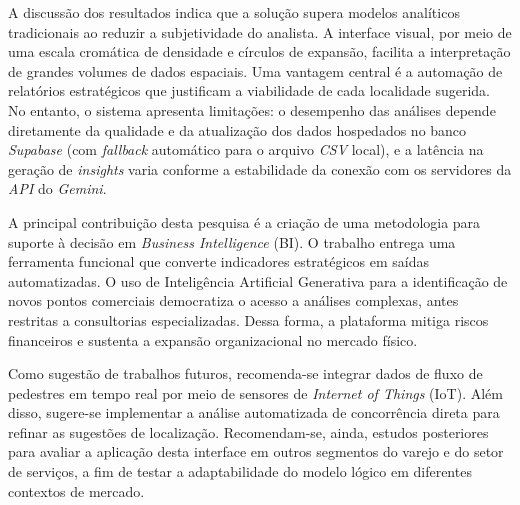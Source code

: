 A discussão dos resultados indica que a solução supera modelos analíticos tradicionais ao reduzir a subjetividade do analista. A interface visual, por meio de uma escala cromática de densidade e círculos de expansão, facilita a interpretação de grandes volumes de dados espaciais. Uma vantagem central é a automação de relatórios estratégicos que justificam a viabilidade de cada localidade sugerida. No entanto, o sistema apresenta limitações: o desempenho das análises depende diretamente da qualidade e da atualização dos dados hospedados no banco \textit{Supabase} (com \textit{fallback} automático para o arquivo \textit{CSV} local), e a latência na geração de \textit{insights} varia conforme a estabilidade da conexão com os servidores da \textit{API} do \textit{Gemini}.

A principal contribuição desta pesquisa é a criação de uma metodologia para suporte à decisão em \textit{Business Intelligence} (BI). O trabalho entrega uma ferramenta funcional que converte indicadores estratégicos em saídas automatizadas. O uso de Inteligência Artificial Generativa para a identificação de novos pontos comerciais democratiza o acesso a análises complexas, antes restritas a consultorias especializadas. Dessa forma, a plataforma mitiga riscos financeiros e sustenta a expansão organizacional no mercado físico.

Como sugestão de trabalhos futuros, recomenda-se integrar dados de fluxo de pedestres em tempo real por meio de sensores de \textit{Internet of Things} (IoT). Além disso, sugere-se implementar a análise automatizada de concorrência direta para refinar as sugestões de localização. Recomendam-se, ainda, estudos posteriores para avaliar a aplicação desta interface em outros segmentos do varejo e do setor de serviços, a fim de testar a adaptabilidade do modelo lógico em diferentes contextos de mercado.

\endinput